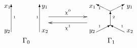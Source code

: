 \documentclass{amsart}
\theoremstyle{plain}
\theoremstyle{definition}
\theoremstyle{remark}
\numberwithin{equation}{section}
\begin{document}
\begin{figure}[ht]
$
\xymatrix{

\setlength{\unitlength}{1pt}
\begin{picture}(60,55)(-30,-15)

\put(-20,0){\vector(0,1){40}}

\put(20,0){\vector(0,1){40}}

\put(-17,20){\tiny{$1$}}

\put(15,20){\tiny{$1$}}

\put(-30,35){\small{$x_1$}}

\put(-30,0){\small{$y_2$}}

\put(23,35){\small{$y_1$}}

\put(23,0){\small{$x_2$}}

\put(-4,-15){$\Gamma_0$}

\end{picture}
 \ar@<8ex>[rr]^{\chi^0} && 
\setlength{\unitlength}{1pt}
\begin{picture}(60,55)(-30,-15)

\put(-20,0){\vector(2,1){20}}

\put(20,0){\vector(-2,1){20}}

\put(0,30){\vector(-2,1){20}}

\put(0,30){\vector(2,1){20}}

\put(0,10){\vector(0,1){20}}

\put(-17,7){\tiny{$1$}}

\put(15,7){\tiny{$1$}}

\put(-17,33){\tiny{$1$}}

\put(15,33){\tiny{$1$}}

\put(3,20){\tiny{${2}$}}

\put(-30,35){\small{$x_1$}}

\put(-30,0){\small{$y_2$}}

\put(23,35){\small{$y_1$}}

\put(23,0){\small{$x_2$}}

\put(-4,-15){$\Gamma_1$}

\end{picture}
 \ar@<-6ex>[ll]^{\chi^1}
}
$
\caption{}\label{def-chi-fig}

\end{figure}
\end{document}
